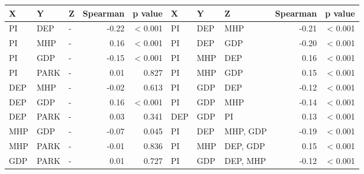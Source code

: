 \begin{tabular}{|l|l|l|r|r||l|l|l|r|r|}
\toprule
X & Y & Z & Spearman & p value & X & Y & Z & Spearman & p value \\
\midrule
PI & DEP & - & -0.22 & \textless{} 0.001 & PI & DEP & MHP & -0.21 & \textless{} 0.001 \\
PI & MHP & - & 0.16 & \textless{} 0.001 & PI & DEP & GDP & -0.20 & \textless{} 0.001 \\
PI & GDP & - & -0.15 & \textless{} 0.001 & PI & MHP & DEP & 0.16 & \textless{} 0.001 \\
PI & PARK & - & 0.01 & 0.827 & PI & MHP & GDP & 0.15 & \textless{} 0.001 \\
DEP & MHP & - & -0.02 & 0.613 & PI & GDP & DEP & -0.12 & \textless{} 0.001 \\
DEP & GDP & - & 0.16 & \textless{} 0.001 & PI & GDP & MHP & -0.14 & \textless{} 0.001 \\
DEP & PARK & - & 0.03 & 0.341 & DEP & GDP & PI & 0.13 & \textless{} 0.001 \\
MHP & GDP & - & -0.07 & 0.045 & PI & DEP & MHP, GDP & -0.19 & \textless{} 0.001 \\
MHP & PARK & - & -0.01 & 0.836 & PI & MHP & DEP, GDP & 0.15 & \textless{} 0.001 \\
GDP & PARK & - & 0.01 & 0.727 & PI & GDP & DEP, MHP & -0.12 & \textless{} 0.001 \\
\bottomrule
\end{tabular}
